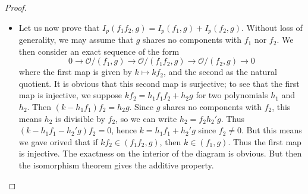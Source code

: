 \begin{proof}
\begin{itemize}
        \item Let us now prove that $I_p(f_1f_2,g) = I_p(f_1,g) + I_p(f_2,g)$. Without loss of generality, we may assume that $g$ shares no components with $f_1$ nor $f_2$. We then consider an exact sequence of the form
        \[ 0 \to \mathcal{O}/(f_1,g) \to \mathcal{O}/(f_1f_2,g) \to \mathcal{O}/(f_2,g) \to 0 \]
        where the first map is given by $k \mapsto kf_2$, and the second as the natural quotient. It is obvious that this second map is surjective; to see that the first map is injective, we suppose $kf_2 = h_1f_1f_2 + h_2g$ for two polynomials $h_1$ and $h_2$. Then $(k - h_1f_1)f_2 = h_2g$. Since $g$ shares no components with $f_2$, this means $h_2$ is divisible by $f_2$, so we can write $h_2 = f_2h_2'g$. Thus $(k - h_1f_1 - h_2'g)f_2 = 0$, hence $k = h_1f_1 + h_2'g$ since $f_2 \neq 0$. But this means we gave orived that if $kf_2 \in (f_1f_2,g)$, then $k \in (f_1,g)$. Thus the first map is injective. The exactness on the interior of the diagram is obvious. But then the isomorphism theorem gives the additive property.


\end{itemize}
\end{proof}
